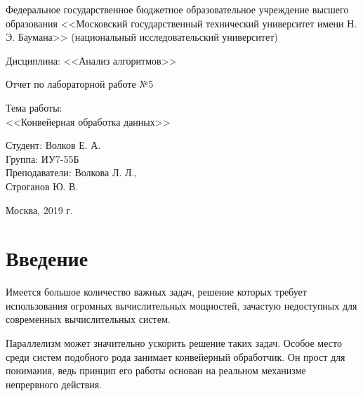 \documentclass[a4paper,12pt]{article}
\begin{document}
\large
\begin{center}
Федеральное государственное бюджетное образовательное учреждение 
высшего образования <<Московский государственный технический 
университет имени Н. Э. Баумана>> 
(национальный исследовательский университет)
\end{center}

\vspace*{30mm} 

\LARGE
\begin{center}
Дисциплина: <<Анализ алгоритмов>>

Отчет по лабораторной работе №5
\end{center}

\vspace*{30mm} 

\huge
\begin{center}
Тема работы:\\
<<Конвейерная обработка данных>>
\end{center}
\vspace*{30mm} 

\large
\begin{flushright}
Студент: Волков Е. А. \\
Группа: ИУ7-55Б \\
Преподаватели: Волкова Л. Л., \\ Строганов Ю. В. \\
\end{flushright}

\vspace*{40mm}
\begin{center}
Москва, 2019 г.  
\end{center}
\thispagestyle{empty}




\tableofcontents

\newpage

\section*{Введение}

Имеется большое количество важных задач, решение которых требует использования огромных вычислительных мощностей, зачастую недоступных для современных 
вычислительных систем.

Параллелизм может значительно ускорить решение
таких задач. Особое место среди систем подобного рода занимает
конвейерный обработчик. Он прост для понимания,
ведь принцип его работы основан на реальном механизме
непрервного действия. ~\cite{voev}
\end{document}
